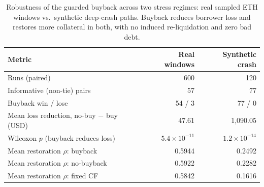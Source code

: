 \begin{table}[h!]
\centering
\caption{Robustness of the guarded buyback across two stress regimes: real sampled ETH windows vs.\ synthetic deep-crash paths. Buyback reduces borrower loss and restores more collateral in both, with no induced re-liquidation and zero bad debt.}
\label{tab:stress_regime_comparison}
\begin{tabular}{@{}lrr@{}}
\toprule
Metric & Real windows & Synthetic crash \\
\midrule
Runs (paired) & 600 & 120 \\
Informative (non-tie) pairs & 57 & 77 \\
Buyback win / lose & 54 / 3 & 77 / 0 \\
Mean loss reduction, no-buy $-$ buy (USD) & 47.61 & 1,090.05 \\
Wilcoxon $p$ (buyback reduces loss) & $5.4\times10^{-11}$ & $1.2\times10^{-14}$ \\
Mean restoration $\rho$: buyback & 0.5944 & 0.2492 \\
Mean restoration $\rho$: no-buyback & 0.5922 & 0.2282 \\
Mean restoration $\rho$: fixed CF & 0.5842 & 0.1616 \\
\bottomrule
\end{tabular}
\end{table}
